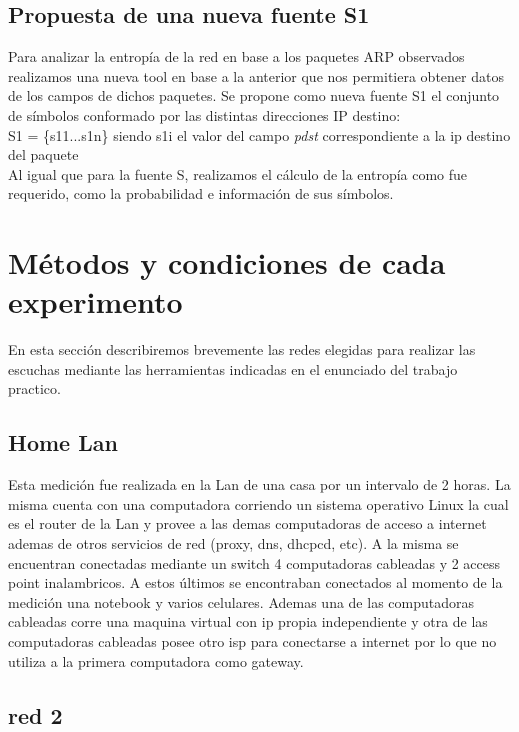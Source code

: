 \documentclass[final,inline,narroweqnarray,a4paper]{ieee}
\begin{document}
\subsection{Propuesta de una nueva fuente S{\scriptsize 1}}
Para analizar la entropía de la red en base a los paquetes ARP observados realizamos una nueva tool en base a la anterior que nos permitiera obtener datos de los campos de dichos paquetes. 
	Se propone como nueva fuente S1 el conjunto de símbolos conformado por las distintas direcciones IP destino:\\
	
	
		S{\scriptsize 1} = \{s{\scriptsize 1}{\tiny 1}...s{\scriptsize 1}{\tiny n}\} siendo s{\scriptsize 1}{\tiny i} el valor del campo \textit{pdst} correspondiente a la ip destino del paquete\\
		
	
	Al igual que para la fuente S, realizamos el cálculo de la entropía como fue requerido, como la probabilidad e información de sus símbolos.  

\section{Métodos y condiciones de cada experimento}

En esta sección describiremos brevemente las redes elegidas para realizar las escuchas mediante las herramientas indicadas en el enunciado del trabajo practico.

\subsection{Home Lan}

Esta medición fue realizada en la Lan de una casa por un intervalo de 2 horas. La misma cuenta con una computadora corriendo un sistema operativo Linux la cual es el router de la Lan y provee a las demas computadoras de acceso a internet ademas de otros servicios de red (proxy, dns, dhcpcd, etc). A la misma se encuentran conectadas mediante un switch 4 computadoras cableadas y 2 access point inalambricos. A estos últimos se encontraban conectados al momento de la medición una notebook y varios celulares. Ademas una de las computadoras cableadas corre una maquina virtual con ip propia independiente y otra de las computadoras cableadas posee otro isp para conectarse a internet por lo que no utiliza a la primera computadora como gateway.

\subsection{red 2}
\end{document}
